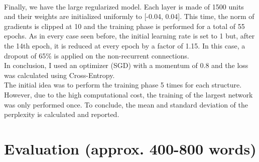 \documentclass[a4paper]{article}
\begin{document}
\\
Finally, we have the large regularized model. Each layer is made of 1500 units and their weights are initialized uniformly to [-0.04, 0.04]. This time, the norm of gradients is clipped at 10 and the training phase is performed for a total of 55 epochs. As in every case seen before, the initial learning rate is set to 1 but, after the 14th epoch, it is reduced at every epoch by a factor of 1.15. In this case, a dropout of 65\% is applied on the non-recurrent connections.
\\
In conclusion, I used an optimizer (SGD) with a momentum of 0.8 and the loss was calculated using Cross-Entropy.
\\
The initial idea was to perform the training phase 5 times for each structure. However, due to the high computational cost, the training of the largest network was only performed once. To conclude, the mean and standard deviation of the perplexity is calculated and reported. 

\section{Evaluation (approx. 400-800 words)}
\end{document}
